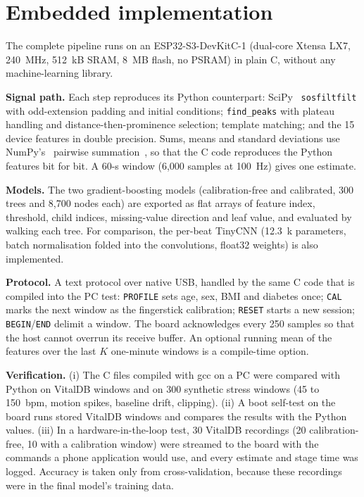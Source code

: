 \documentclass[11pt]{article}
\begin{document}
\section{Embedded implementation}
\label{sec:embedded}
The complete pipeline runs on an ESP32-S3-DevKitC-1 (dual-core Xtensa LX7, 240~MHz, 512~kB SRAM, 8~MB flash, no PSRAM) in plain C, without any machine-learning library.

\textbf{Signal path.} Each step reproduces its Python counterpart: SciPy~\citep{virtanen2020} \texttt{sosfiltfilt} with odd-extension padding and initial conditions; \texttt{find\_peaks} with plateau handling and distance-then-prominence selection; template matching; and the 15 device features in double precision. Sums, means and standard deviations use NumPy's~\citep{harris2020} pairwise summation~\citep{higham1993}, so that the C code reproduces the Python features bit for bit. A 60-s window (6,000 samples at 100~Hz) gives one estimate.

\textbf{Models.} The two gradient-boosting models (calibration-free and calibrated, 300 trees and 8,700 nodes each) are exported as flat arrays of feature index, threshold, child indices, missing-value direction and leaf value, and evaluated by walking each tree. For comparison, the per-beat TinyCNN (12.3~k parameters, batch normalisation folded into the convolutions, float32 weights) is also implemented.

\textbf{Protocol.} A text protocol over native USB, handled by the same C code that is compiled into the PC test: \texttt{PROFILE} sets age, sex, BMI and diabetes once; \texttt{CAL} marks the next window as the fingerstick calibration; \texttt{RESET} starts a new session; \texttt{BEGIN}/\texttt{END} delimit a window. The board acknowledges every 250 samples so that the host cannot overrun its receive buffer. An optional running mean of the features over the last $K$ one-minute windows is a compile-time option.

\textbf{Verification.} (i) The C files compiled with gcc on a PC were compared with Python on VitalDB windows and on 300 synthetic stress windows (45 to 150~bpm, motion spikes, baseline drift, clipping). (ii) A boot self-test on the board runs stored VitalDB windows and compares the results with the Python values. (iii) In a hardware-in-the-loop test, 30 VitalDB recordings (20 calibration-free, 10 with a calibration window) were streamed to the board with the commands a phone application would use, and every estimate and stage time was logged. Accuracy is taken only from cross-validation, because these recordings were in the final model's training data.
\end{document}
